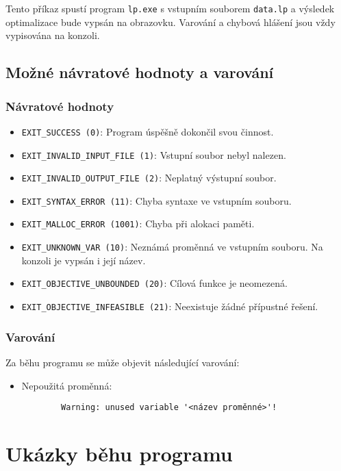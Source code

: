 \documentclass[czech, sem, kiv, he, pdf, viewonly]{fasthesis}
\begin{document}
Tento příkaz spustí program \texttt{lp.exe} s vstupním souborem \texttt{data.lp} a výsledek optimalizace bude vypsán na obrazovku. Varování a chybová hlášení jsou vždy vypisována na konzoli.

\subsection{Možné návratové hodnoty a varování}

\subsubsection*{Návratové hodnoty}
\begin{itemize}
    \item \texttt{EXIT\_SUCCESS (0)}: Program úspěšně dokončil svou činnost.
    \item \texttt{EXIT\_INVALID\_INPUT\_FILE (1)}: Vstupní soubor nebyl nalezen.
    \item \texttt{EXIT\_INVALID\_OUTPUT\_FILE (2)}: Neplatný výstupní soubor.
    \item \texttt{EXIT\_SYNTAX\_ERROR (11)}: Chyba syntaxe ve vstupním souboru.
    \item \texttt{EXIT\_MALLOC\_ERROR (1001)}: Chyba při alokaci paměti.
    \item \texttt{EXIT\_UNKNOWN\_VAR (10)}: Neznámá proměnná ve vstupním souboru. Na konzoli je vypsán i její název.
    \item \texttt{EXIT\_OBJECTIVE\_UNBOUNDED (20)}: Cílová funkce je neomezená.
    \item \texttt{EXIT\_OBJECTIVE\_INFEASIBLE (21)}: Neexistuje žádné přípustné řešení.
\end{itemize}

\subsubsection*{Varování}
Za běhu programu se může objevit následující varování:
\begin{itemize}
    \item Nepoužitá proměnná:
        \begin{verbatim}
        Warning: unused variable '<název proměnné>'!
        \end{verbatim}
\end{itemize}

\section{Ukázky běhu programu}
\end{document}

